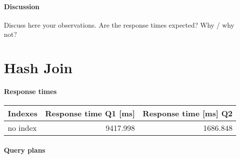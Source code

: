 \documentclass[11pt]{scrartcl}
\begin{document}
\paragraph{Discussion}
Discuss here your observations. Are the response times expected? Why
/ why not? 

\section{Hash Join}

\paragraph{Response times}

\begin{flushleft}
\begin{tabular}{l|r|r}
  Indexes & Response time Q1 [ms] & Response time [ms] Q2 \\
  \hline
  no index & 9417.998 & 1686.848 \\
\end{tabular}
\end{flushleft}

\paragraph{Query plans}\mbox{}\\ 
\end{document}
